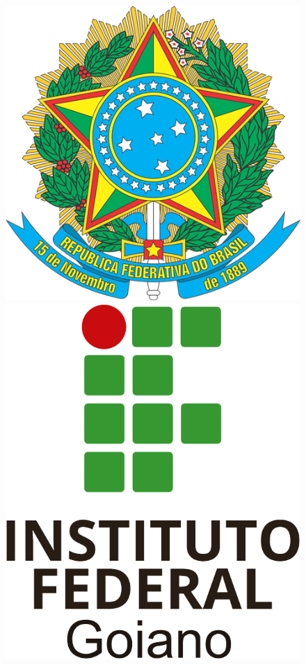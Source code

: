 \documentclass[chapter=TITLE,12pt,oneside,a4paper,english,french,sumario=tradicional,spanish,brazil,]{abntex2}
\begin{document}
\thispagestyle{empty}

\begin{figure}[t]\centering
    \begin{minipage}[t]{0.13\linewidth}
        \includegraphics[width=\linewidth]{logobr.png}
    \end{minipage}
        \hfill
    \begin{minipage}[t]{0.11\linewidth}
        \includegraphics[width=\linewidth]{logoif.pdf}
    \end{minipage}
\end{figure}
\end{document}
